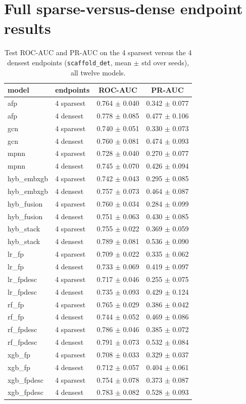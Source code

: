 \documentclass[conference]{IEEEtran}
\newcommand{\code}[1]{\texttt{\small #1}}
\begin{document}
\section{Full sparse-versus-dense endpoint results}
\label{app:sparse}
\begin{table}[h]
\centering
\caption{Test ROC-AUC and PR-AUC on the 4 sparsest versus the 4 densest endpoints
(\code{scaffold\_det}, mean $\pm$ std over seeds), all twelve models.}
\small
\begin{tabular}{llcc}
\toprule
model & endpoints & ROC-AUC & PR-AUC \\
\midrule
afp & 4 sparsest & 0.764 $\pm$ 0.040 & 0.342 $\pm$ 0.077 \\
afp & 4 densest & 0.778 $\pm$ 0.085 & 0.477 $\pm$ 0.106 \\
gcn & 4 sparsest & 0.740 $\pm$ 0.051 & 0.330 $\pm$ 0.073 \\
gcn & 4 densest & 0.760 $\pm$ 0.081 & 0.474 $\pm$ 0.093 \\
mpnn & 4 sparsest & 0.728 $\pm$ 0.040 & 0.270 $\pm$ 0.077 \\
mpnn & 4 densest & 0.745 $\pm$ 0.070 & 0.426 $\pm$ 0.094 \\
hyb\_embxgb & 4 sparsest & 0.742 $\pm$ 0.043 & 0.295 $\pm$ 0.085 \\
hyb\_embxgb & 4 densest & 0.757 $\pm$ 0.073 & 0.464 $\pm$ 0.087 \\
hyb\_fusion & 4 sparsest & 0.760 $\pm$ 0.034 & 0.284 $\pm$ 0.099 \\
hyb\_fusion & 4 densest & 0.751 $\pm$ 0.063 & 0.430 $\pm$ 0.085 \\
hyb\_stack & 4 sparsest & 0.755 $\pm$ 0.022 & 0.369 $\pm$ 0.059 \\
hyb\_stack & 4 densest & 0.789 $\pm$ 0.081 & 0.536 $\pm$ 0.090 \\
lr\_fp & 4 sparsest & 0.709 $\pm$ 0.022 & 0.335 $\pm$ 0.062 \\
lr\_fp & 4 densest & 0.733 $\pm$ 0.069 & 0.419 $\pm$ 0.097 \\
lr\_fpdesc & 4 sparsest & 0.717 $\pm$ 0.046 & 0.255 $\pm$ 0.075 \\
lr\_fpdesc & 4 densest & 0.735 $\pm$ 0.093 & 0.429 $\pm$ 0.124 \\
rf\_fp & 4 sparsest & 0.765 $\pm$ 0.029 & 0.386 $\pm$ 0.042 \\
rf\_fp & 4 densest & 0.744 $\pm$ 0.052 & 0.469 $\pm$ 0.086 \\
rf\_fpdesc & 4 sparsest & 0.786 $\pm$ 0.046 & 0.385 $\pm$ 0.072 \\
rf\_fpdesc & 4 densest & 0.791 $\pm$ 0.073 & 0.532 $\pm$ 0.084 \\
xgb\_fp & 4 sparsest & 0.708 $\pm$ 0.033 & 0.329 $\pm$ 0.037 \\
xgb\_fp & 4 densest & 0.712 $\pm$ 0.057 & 0.404 $\pm$ 0.061 \\
xgb\_fpdesc & 4 sparsest & 0.754 $\pm$ 0.078 & 0.373 $\pm$ 0.087 \\
xgb\_fpdesc & 4 densest & 0.783 $\pm$ 0.082 & 0.528 $\pm$ 0.093 \\
\bottomrule
\end{tabular}
\end{table}
\end{document}
